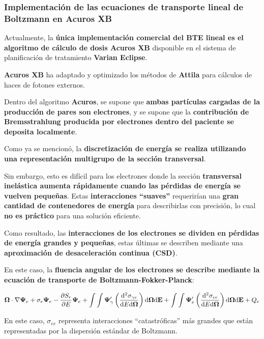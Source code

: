 \documentclass[aspectratio=169,xcolor=dvipsnames,t]{beamer}
\newcommand{\bae}{\begin{eqnarray}}
\newcommand{\eae}{\end{eqnarray}}
\newcommand{\pl}{\left(}
\newcommand{\pr}{\right)}
\begin{document}
\begin{frame}

    \frametitle{Implementación de las ecuaciones de transporte lineal de Boltzmann en Acuros XB}

    Actualmente, la \textbf{única implementación comercial del BTE lineal es el algoritmo de cálculo de dosis Acuros XB} disponible en el sistema de planificación de tratamiento \textbf{Varian Eclipse}.

    \textbf{Acuros XB} ha adaptado y optimizado los métodos de \textbf{Attila} para cálculos de haces de fotones externos.

    Dentro del algoritmo \textbf{Acuros}, se supone que \textbf{ambas partículas cargadas de la producción de pares son electrones}, y se supone que la \textbf{contribución de Bremsstrahlung producida por electrones dentro del paciente se deposita localmente}.

    Como ya se mencionó, la \textbf{discretización de energía se realiza utilizando una representación multigrupo de la sección transversal}.

\end{frame}

\begin{frame}

    Sin embargo, esto es difícil para los electrones donde la sección \textbf{transversal inelástica aumenta rápidamente cuando las pérdidas de energía se vuelven pequeñas}. Estas \textbf{interacciones “suaves”} requerirían una \textbf{gran cantidad de contenedores de energía} para describirlas con precisión, lo cual \textbf{no es práctico} para una solución eficiente.

    Como resultado, las \textbf{interacciones de los electrones se dividen en pérdidas de energía grandes y pequeñas}, estas últimas se describen mediante una \textbf{aproximación de desaceleración continua (CSD)}.

    En este caso, la \textbf{fluencia angular de los electrones se describe mediante la ecuación de transporte de Boltzmann-Fokker-Planck}:

    \vspace{-0.2cm}

    \bae
    \bm{\Omega} \cdot \nabla \bm{\Psi}_{e} + \sigma_{e} \bm{\Psi}_{e} - \pdv{S_r}{E} \bm{\Psi}_{e} + \int \int \bm{\Psi}_\gamma' \pl \frac{\dd[2]{\sigma_{\gamma e}}}{\dd E \dd \bm{\Omega}} \pr \text{d}\bm{\Omega} \text{d}\mathbf{E} + \int \int \bm{\Psi}_e' \pl \frac{\dd[2]{\sigma_{ee}}}{\dd E \dd \bm{\Omega}} \pr \text{d}\bm{\Omega} \text{d}\mathbf{E} + Q_{e}
    \eae

    En este caso, $\sigma_{ee}$ representa interacciones “catastróficas” más grandes que están representadas por la dispersión estándar de Boltzmann.

\end{frame}
\end{document}
